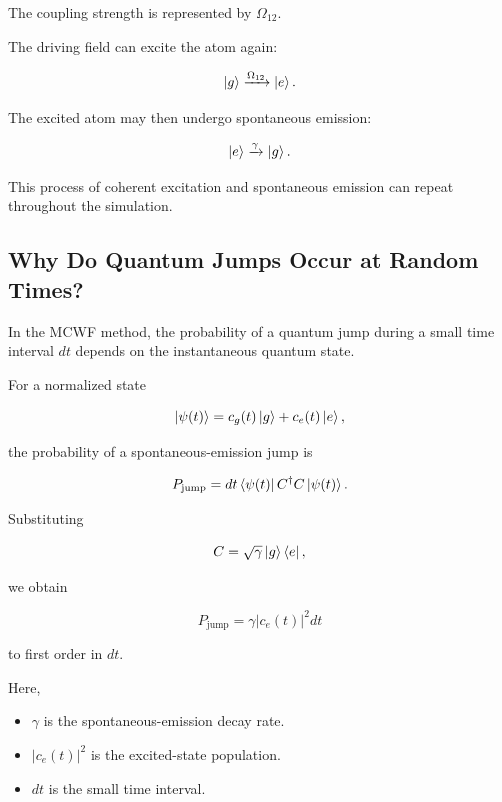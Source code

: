 \documentclass[12pt,a4paper]{report}
\begin{document}
The coupling strength is represented by $\Omega_{12}$.

The driving field can excite the atom again:

\begin{equation}
\ket{g}
\xrightarrow{\Omega_{12}}
\ket{e}.
\end{equation}

The excited atom may then undergo spontaneous emission:

\begin{equation}
\ket{e}
\xrightarrow{\gamma}
\ket{g}.
\end{equation}

This process of coherent excitation and spontaneous
emission can repeat throughout the simulation.

\subsection{Why Do Quantum Jumps Occur at Random Times?}

In the MCWF method, the probability of a quantum jump
during a small time interval $dt$ depends on the
instantaneous quantum state.

For a normalized state

\begin{equation}
\ket{\psi(t)}
=
c_g(t)\ket{g}+c_e(t)\ket{e},
\end{equation}

the probability of a spontaneous-emission jump is

\begin{equation}
P_{\mathrm{jump}}
=
dt\bra{\psi(t)}C^\dagger C\ket{\psi(t)}.
\end{equation}

Substituting

\begin{equation}
C=\sqrt{\gamma}\ket{g}\bra{e},
\end{equation}

we obtain

\begin{equation}
\boxed{
P_{\mathrm{jump}}
=
\gamma |c_e(t)|^2dt
}
\end{equation}

to first order in $dt$.

Here,

\begin{itemize}
    \item $\gamma$ is the spontaneous-emission decay rate.
    \item $|c_e(t)|^2$ is the excited-state population.
    \item $dt$ is the small time interval.
\end{itemize}
\end{document}
